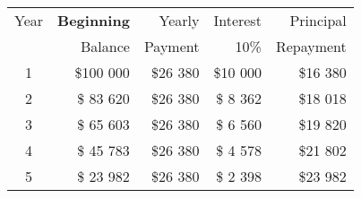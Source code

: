 \begin{tabular}{|c|r|r|r|r|}
\hline
Year  & \textbf{Beginning} & Yearly & Interest & Principal\\
      & Balance & Payment & 10\% & Repayment \\
\hline
1 & \$100 000 & \$26 380 & \$10 000 & \$16 380 \\
2 & \$ 83 620 & \$26 380 & \$ 8 362 & \$18 018 \\
3 & \$ 65 603 & \$26 380 & \$ 6 560 & \$19 820 \\
4 & \$ 45 783 & \$26 380 & \$ 4 578 & \$21 802 \\
5 & \$ 23 982 & \$26 380 & \$ 2 398 & \$23 982 \\
\hline
\end{tabular}